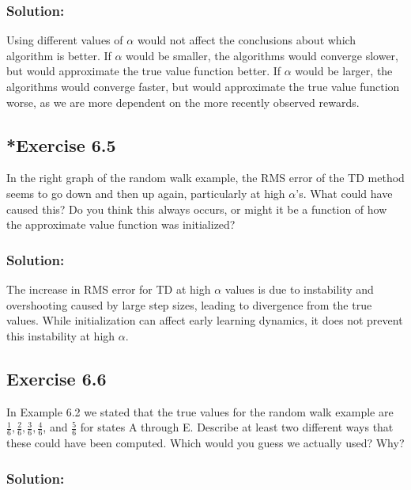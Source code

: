 \subsubsection*{Solution:}
Using different values of $\alpha$ would not affect the conclusions about which algorithm is better.
If $\alpha$ would be smaller, the algorithms would converge slower, but would approximate the true value function better.
If $\alpha$ would be larger, the algorithms would converge faster, but would approximate the true value function worse, as we are more dependent on the more recently observed rewards.

\subsection*{*Exercise 6.5}
In the right graph of the random walk example, the RMS error of the
TD method seems to go down and then up again, particularly at high $\alpha$'s. What could
have caused this? Do you think this always occurs, or might it be a function of how the
approximate value function was initialized? 

\subsubsection*{Solution:}
The increase in RMS error for TD at high $\alpha$ values is due to instability and overshooting caused by 
large step sizes, leading to divergence from the true values. While initialization can affect early learning dynamics,
it does not prevent this instability at high $\alpha$.

\subsection*{Exercise 6.6}
In Example 6.2 we stated that the true values for the random walk example
are $\frac{1}{6}, \frac{2}{6}, \frac{3}{6}, \frac{4}{6}$, and $\frac{5}{6}$ for states A through E. Describe at least two different ways that
these could have been computed. Which would you guess we actually used? Why?

\subsubsection*{Solution:}

